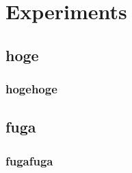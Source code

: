 \chapter{Experiments}\label{ch:experiments}
\section{hoge}
\subsection{hogehoge}
\section{fuga}
\subsection{fugafuga}